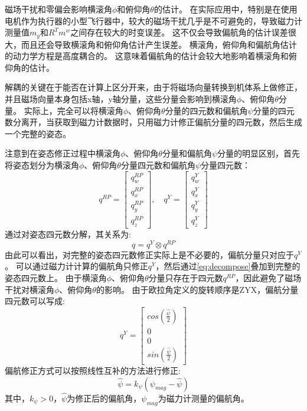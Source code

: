 \documentclass[
  type=master
]{gdutthesis}
\begin{document}
磁场干扰和零偏会影响横滚角$\phi$和俯仰角$\theta$的估计。
在实际应用中，特别是在使用电机作为执行器的小型飞行器中，较大的磁场干扰几乎是不可避免的，导致磁力计测量值$m_y$和$R^T m^w$之间存在较大的时变误差。
这不仅会导致偏航角的估计误差很大，而且还会导致横滚角和俯仰角估计产生误差。
横滚角，俯仰角和偏航角估计的动力学方程是高度耦合的。
这意味着偏航角的估计会较大地影响着横滚角和俯仰角的估计。

解耦的关键在于能否在计算上区分开来，由于将磁场向量转换到机体系上做修正，并且磁场向量本身包括x轴，y轴分量，这些分量会影响到横滚角$\phi$、俯仰角$\theta$分量。
实际上，完全可以将横滚角$\phi$、俯仰角$\theta$分量的四元数和偏航角$\psi$分量的四元数分离开，当获取到磁力计数据时，只用磁力计修正偏航分量的四元数，然后生成一个完整的姿态。

注意到在姿态修正过程中横滚角$\phi$、俯仰角$\theta$分量和偏航角$\psi$分量的明显区别，首先将姿态划分为横滚角$\phi$、俯仰角$\theta$分量四元数和偏航角$\psi$分量四元数：\vspace{1ex}
\[
q^{RP} = 
\begin{bmatrix}
	q_w^{RP} \\
	q_x^{RP} \\
	q_y^{RP} \\
	q_z^{RP}
\end{bmatrix},
\hspace{1em}
q^{Y} = 
\begin{bmatrix}
	q_w^{Y} \\
	q_x^{Y} \\
	q_y^{Y} \\
	q_z^{Y}
\end{bmatrix}
\]
通过对姿态四元数分解，其关系为:
\begin{equation}\label{eq:decompose}
	q = q^{Y} \otimes q^{RP}	
\end{equation}
由此可以看出，对完整的姿态四元数修正实际上是不必要的，偏航分量只对应于$q^{Y}$。
可以通过磁力计计算的偏航角只修正$q^{Y}$，然后通过\autoref{eq:decompose}叠加到完整的姿态四元数上。
由于横滚角$\phi$、俯仰角$\theta$分量只存在于四元数$q^{RP}$，因此避免了磁场干扰对横滚角$\phi$、俯仰角$\theta$的影响。
由于欧拉角定义的旋转顺序是ZYX，偏航分量四元数可以写成:
\begin{equation}
	q^{Y} = 
	\begin{bmatrix}
		cos(\frac{\hat{\psi}}{2}) \\
		0 \\
		0 \\
		sin(\frac{\hat{\psi}}{2})
	\end{bmatrix}	
\end{equation}
偏航修正方式可以按照线性互补的方法进行修正:
\begin{equation}
	\hat{\psi} = k_{\psi} (\psi_{mag} - \hat{\psi}) 	
\end{equation}
其中，$k_{\psi} > 0$，$\hat{\psi}$为修正后的偏航角，$\psi_{mag}$为磁力计测量的偏航角。
\end{document}
